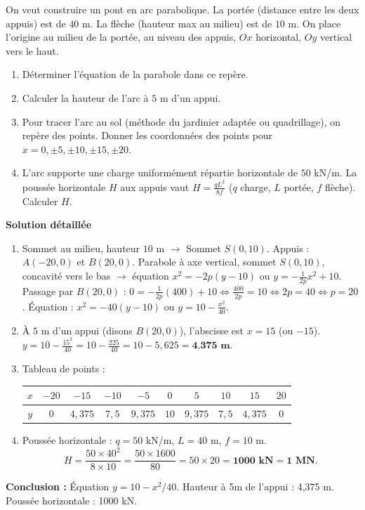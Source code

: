 \documentclass[11pt]{article}
\begin{document}
\begin{exoresolu}
On veut construire un pont en arc parabolique. La portée (distance entre les deux appuis) est de $40$ m. La flèche (hauteur max au milieu) est de $10$ m. On place l'origine au milieu de la portée, au niveau des appuis, $Ox$ horizontal, $Oy$ vertical vers le haut.
\begin{enumerate}
    \item Déterminer l'équation de la parabole dans ce repère.
    \item Calculer la hauteur de l'arc à $5$ m d'un appui.
    \item Pour tracer l'arc au sol (méthode du jardinier adaptée ou quadrillage), on repère des points. Donner les coordonnées des points pour $x = 0, \pm 5, \pm 10, \pm 15, \pm 20$.
    \item L'arc supporte une charge uniformément répartie horizontale de $50$ kN/m. La poussée horizontale $H$ aux appuis vaut $H = \frac{q L^2}{8f}$ ($q$ charge, $L$ portée, $f$ flèche). Calculer $H$.
\end{enumerate}
\tcblower
\textbf{Solution détaillée}
\begin{enumerate}
    \item Sommet au milieu, hauteur $10$ m $\to$ Sommet $S(0, 10)$. Appuis : $A(-20, 0)$ et $B(20, 0)$.
    Parabole à axe vertical, sommet $S(0,10)$, concavité vers le bas $\to$ équation $x^2 = -2p(y-10)$ ou $y = -\frac{1}{2p}x^2 + 10$.
    Passage par $B(20,0)$ : $0 = -\frac{1}{2p}(400) + 10 \iff \frac{400}{2p} = 10 \iff 2p = 40 \iff p = 20$.
    Équation : \textbf{$x^2 = -40(y-10)$} ou \textbf{$y = 10 - \frac{x^2}{40}$}.
    \item À $5$ m d'un appui (disons $B(20,0)$), l'abscisse est $x = 15$ (ou $-15$).
    $y = 10 - \frac{15^2}{40} = 10 - \frac{225}{40} = 10 - 5,625 = \textbf{4,375 m}$.
    \item Tableau de points :
    \begin{center}
    \begin{tabular}{|c|c|c|c|c|c|c|c|c|c|}\hline
    $x$ & $-20$ & $-15$ & $-10$ & $-5$ & $0$ & $5$ & $10$ & $15$ & $20$ \\ \hline
    $y$ & $0$ & $4,375$ & $7,5$ & $9,375$ & $10$ & $9,375$ & $7,5$ & $4,375$ & $0$ \\ \hline
    \end{tabular}
    \end{center}
    \item Poussée horizontale : $q = 50$ kN/m, $L = 40$ m, $f = 10$ m.
    \[ H = \frac{50 \times 40^2}{8 \times 10} = \frac{50 \times 1600}{80} = 50 \times 20 = \textbf{1000 kN} = \textbf{1 MN}. \]
\end{enumerate}
\textbf{Conclusion :} Équation $y=10-x^2/40$. Hauteur à 5m de l'appui : 4,375 m. Poussée horizontale : 1000 kN.
\end{exoresolu}
\end{document}
